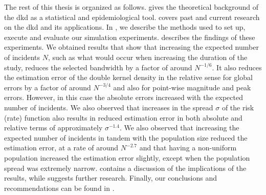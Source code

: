 The rest of this thesis is organized as follows.
 gives the theoretical background of the \gls{dkd} as a statistical and epidemiological tool.
 covers past and current research on the \gls{dkd} and its applications.
In , we describe the methods used to set up, execute and evaluate our simulation experiments.
 describes the findings of these experiments.
We obtained results that show that increasing the expected number of incidents $N$,
such as what would occur when increasing the duration of the study,
reduces the selected bandwidth by a factor of around $N^{-1/6}$.
It also reduces the estimation error of the double kernel density in the relative sense
for global errors by a factor of around $N^{-3/4}$ and also for point-wise magnitude and peak errors.
However, in this case the absolute errors increased with the expected number of incidents.
We also observed that increases in the spread $\sigma$ of the risk (rate) function also results in reduced estimation error
in both absolute and relative terms of approximately $\sigma^{-1.4}$.
We also observed that increasing the expected number of incidents in tandem with the population size reduced the estimation error,
at a rate of around $N^{-2.7}$
and that having a non-uniform population increased the estimation error slightly, 
except when the population spread was extremely narrow.
 contains a discussion of the implications of the results,
while  suggests further research.
Finally, our conclusions and recommendations can be found in .

